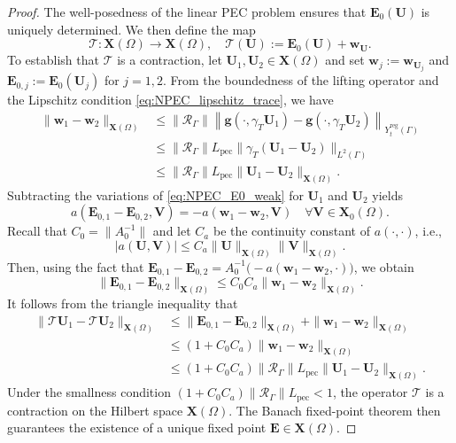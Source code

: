 \documentclass[12pt,reqno]{amsart}
\theoremstyle{definition}
\numberwithin{equation}{section}
\begin{document}
\begin{proof}
The well-posedness of the linear PEC problem ensures that $\mathbf{E}_0(\mathbf{U})$ is uniquely determined. We then define the map
\[
\mathcal{T} : \mathbf{X}(\Omega) \to \mathbf{X}(\Omega), \quad \mathcal{T}(\mathbf{U}) := \mathbf{E}_0(\mathbf{U}) + \mathbf{w}_{\mathbf{U}}.
\]
To establish that $\mathcal{T}$ is a contraction, let $\mathbf{U}_1, \mathbf{U}_2 \in \mathbf{X}(\Omega)$ and set $\mathbf{w}_j := \mathbf{w}_{\mathbf{U}_j}$ and $\mathbf{E}_{0,j} := \mathbf{E}_0(\mathbf{U}_j)$ for $j=1,2$. From the boundedness of the lifting operator and the Lipschitz condition \eqref{eq:NPEC_lipschitz_trace}, we have
\[
\begin{aligned}
\|\mathbf{w}_1 - \mathbf{w}_2\|_{\mathbf{X}(\Omega)} &\le \|\mathcal{R}_\Gamma\| \left\| \mathbf{g}(\cdot, \gamma_T \mathbf{U}_1) - \mathbf{g}(\cdot, \gamma_T \mathbf{U}_2) \right\|_{Y_t^{\mathrm{reg}}(\Gamma)} \\
&\le \|\mathcal{R}_\Gamma\| L_{\mathrm{pec}} \|\gamma_T(\mathbf{U}_1 - \mathbf{U}_2)\|_{L^2(\Gamma)} \\
&\le \|\mathcal{R}_\Gamma\| L_{\mathrm{pec}} \|\mathbf{U}_1 - \mathbf{U}_2\|_{\mathbf{X}(\Omega)}.
\end{aligned}
\]
Subtracting the variations of \eqref{eq:NPEC_E0_weak} for $\mathbf{U}_1$ and $\mathbf{U}_2$ yields
\[
a(\mathbf{E}_{0,1} - \mathbf{E}_{0,2}, \mathbf{V}) = -a(\mathbf{w}_1 - \mathbf{w}_2, \mathbf{V}) \quad \forall \mathbf{V} \in \mathbf{X}_0(\Omega).
\]
Recall that $C_0 = \|A_0^{-1}\|$ and let $C_a$ be the continuity constant of $a(\cdot,\cdot)$, i.e.,
\[
|a(\mathbf{U},\mathbf{V})| \le C_a \|\mathbf{U}\|_{\mathbf{X}(\Omega)}\|\mathbf{V}\|_{\mathbf{X}(\Omega)}.
\]
Then, using the fact that $\mathbf{E}_{0,1} - \mathbf{E}_{0,2} = A_0^{-1}\bigl(-a(\mathbf{w}_1-\mathbf{w}_2,\cdot)\bigr)$, we obtain
\[
\|\mathbf{E}_{0,1} - \mathbf{E}_{0,2}\|_{\mathbf{X}(\Omega)} \le C_0 C_a \|\mathbf{w}_1 - \mathbf{w}_2\|_{\mathbf{X}(\Omega)}.
\]
It follows from the triangle inequality that
\[
\begin{aligned}
\|\mathcal{T}\mathbf{U}_1 - \mathcal{T}\mathbf{U}_2\|_{\mathbf{X}(\Omega)} &\le \|\mathbf{E}_{0,1} - \mathbf{E}_{0,2}\|_{\mathbf{X}(\Omega)} + \|\mathbf{w}_1 - \mathbf{w}_2\|_{\mathbf{X}(\Omega)} \\
&\le (1 + C_0 C_a) \|\mathbf{w}_1 - \mathbf{w}_2\|_{\mathbf{X}(\Omega)} \\
&\le (1 + C_0 C_a) \|\mathcal{R}_\Gamma\| L_{\mathrm{pec}} \|\mathbf{U}_1 - \mathbf{U}_2\|_{\mathbf{X}(\Omega)}.
\end{aligned}
\]
Under the smallness condition $(1 + C_0 C_a) \|\mathcal{R}_\Gamma\| L_{\mathrm{pec}} < 1$, the operator $\mathcal{T}$ is a contraction on the Hilbert space $\mathbf{X}(\Omega)$. The Banach fixed-point theorem then guarantees the existence of a unique fixed point $\mathbf{E} \in \mathbf{X}(\Omega)$.


\end{proof}
\end{document}
